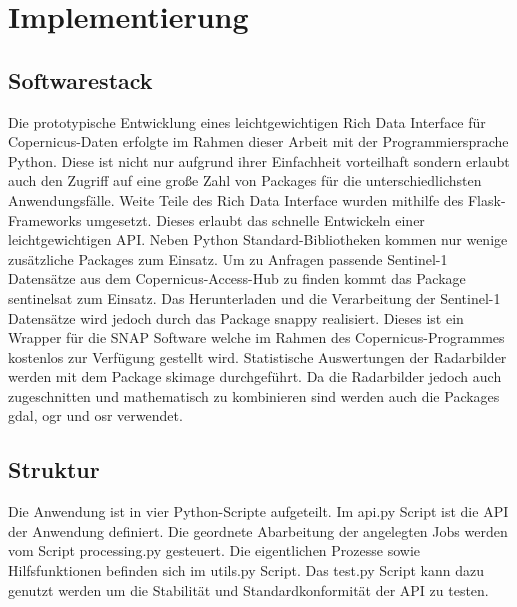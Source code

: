 \newpage
\restoregeometry
\section{Implementierung}
\subsection{Softwarestack}
Die prototypische Entwicklung eines leichtgewichtigen Rich Data Interface für Copernicus-Daten erfolgte im Rahmen dieser Arbeit mit der Programmiersprache Python.
Diese ist nicht nur aufgrund ihrer Einfachheit vorteilhaft sondern erlaubt auch den Zugriff auf eine große Zahl von Packages für die unterschiedlichsten 
Anwendungsfälle. 
Weite Teile des Rich Data Interface wurden mithilfe des Flask-Frameworks umgesetzt. Dieses erlaubt das schnelle Entwickeln einer leichtgewichtigen API.  
Neben Python Standard-Bibliotheken kommen nur wenige zusätzliche Packages zum Einsatz. Um zu Anfragen passende Sentinel-1 Datensätze aus dem 
Copernicus-Access-Hub zu finden kommt das Package sentinelsat zum Einsatz. Das Herunterladen und die Verarbeitung der Sentinel-1 Datensätze wird jedoch 
durch das Package snappy realisiert. Dieses ist ein Wrapper für die SNAP Software welche im Rahmen des Copernicus-Programmes kostenlos zur Verfügung 
gestellt wird. Statistische Auswertungen der Radarbilder werden mit dem Package skimage durchgeführt. Da die Radarbilder jedoch auch zugeschnitten und 
mathematisch zu kombinieren sind werden auch die Packages gdal, ogr und osr verwendet. 

\subsection{Struktur}
Die Anwendung ist in vier Python-Scripte aufgeteilt. Im api.py Script ist die API der Anwendung definiert. 
Die geordnete Abarbeitung der angelegten Jobs werden vom Script processing.py gesteuert. Die eigentlichen Prozesse sowie 
Hilfsfunktionen befinden sich im utils.py Script. Das test.py Script kann dazu genutzt werden um die Stabilität und Standardkonformität der API zu testen.

